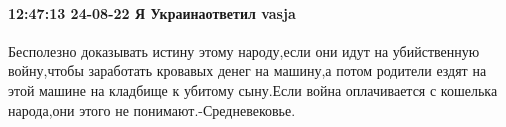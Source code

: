  
 
 
 
 

\paragraph{12:47:13 24-08-22 Я Украинаответил vasja}

Бесполезно доказывать истину этому народу,если они идут на убийственную
войну,чтобы заработать кровавых денег на машину,а потом родители ездят на этой
машине на кладбище к убитому сыну.Если война оплачивается с кошелька народа,они
этого не понимают.-Средневековье.
